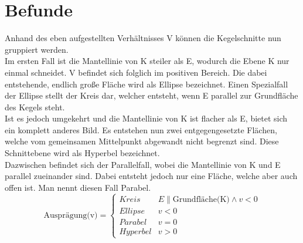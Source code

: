 \section{Befunde}
Anhand des eben aufgestellten Verhältnisses V können die Kegelschnitte nun gruppiert werden.\\
Im ersten Fall ist die Mantellinie von K steiler als E, wodurch die Ebene K nur einmal schneidet. V befindet sich folglich im positiven Bereich. Die dabei entstehende, endlich große Fläche wird als Ellipse bezeichnet. Einen Spezialfall der Ellipse stellt der Kreis dar, welcher entsteht, wenn E parallel zur Grundfläche des Kegels steht.\\
Ist es jedoch umgekehrt und die Mantellinie von K ist flacher als E, bietet sich ein komplett anderes Bild. Es entstehen nun zwei entgegengesetzte Flächen, welche vom gemeinsamen Mittelpunkt abgewandt nicht begrenzt sind. Diese Schnittebene wird als Hyperbel bezeichnet.\\
Dazwischen befindet sich der Parallelfall, wobei die Mantellinie von K und E parallel zueinander sind. Dabei entsteht jedoch nur eine Fläche, welche aber auch offen ist. Man nennt diesen Fall Parabel.\\
\begin{displaymath}
   \text{Ausprägung(v)} = \left\{
     \begin{array}{lr}
       Kreis & E \parallel \text{Grundfläche(K)} \wedge v < 0 \\
       Ellipse & v < 0\\
       Parabel & v = 0\\
       Hyperbel & v > 0
     \end{array}
   \right.
\end{displaymath}